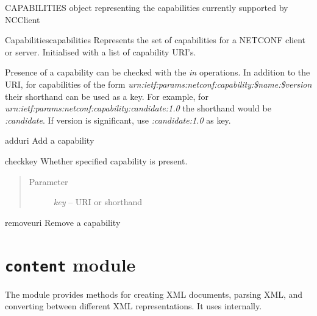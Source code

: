 \documentclass[a4paper,10pt,english]{manual}
\begin{document}
\hypertarget{ncclient.capabilities.CAPABILITIES}{}\begin{datadesc}{CAPABILITIES}
\hyperlink{ncclient.capabilities.Capabilities}{} object representing the capabilities currently supported by NCClient
\end{datadesc}

\hypertarget{ncclient.capabilities.Capabilities}{}\begin{classdesc}{Capabilities}{capabilities}
Represents the set of capabilities for a NETCONF client or server.
Initialised with a list of capability URI's.

Presence of a capability can be checked with the \emph{in} operations. In addition
to the URI, for capabilities of the form
\emph{urn:ietf:params:netconf:capability:\$name:\$version} their shorthand can be
used as a key. For example, for
\emph{urn:ietf:params:netconf:capability:candidate:1.0} the shorthand would be
\emph{:candidate}. If version is significant, use \emph{:candidate:1.0} as key.

\hypertarget{ncclient.capabilities.Capabilities.add}{}\begin{methoddesc}{add}{uri}
Add a capability
\end{methoddesc}

\hypertarget{ncclient.capabilities.Capabilities.check}{}\begin{methoddesc}{check}{key}
Whether specified capability is present.
\begin{quote}\begin{description}
\item[Parameter]
\emph{key} -- URI or shorthand

\end{description}\end{quote}
\end{methoddesc}

\hypertarget{ncclient.capabilities.Capabilities.remove}{}\begin{methoddesc}{remove}{uri}
Remove a capability
\end{methoddesc}
\end{classdesc}

\resetcurrentobjects
\hypertarget{--doc-userdoc/content}{}

\section{\texttt{content} module}
\hypertarget{module-ncclient.content}{}
The  module provides methods for creating XML documents, parsing XML, and converting between different XML representations. It uses \href{http://docs.python.org/library/xml.etree.elementtree.html\#module-xml.etree.ElementTree}{} internally.
\end{document}
